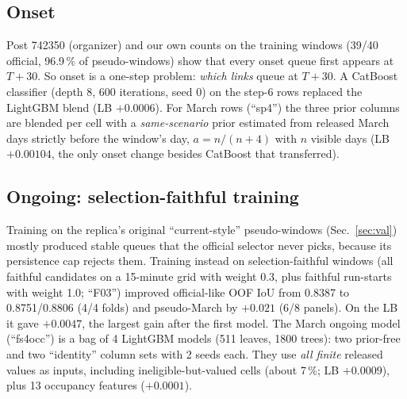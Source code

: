 \documentclass[conference,10pt]{IEEEtran}
\begin{document}
\subsection{Onset}
Post 742350 (organizer) and our own counts on the training windows (39/40 official, 96.9\,\% of pseudo-windows) show that every
onset queue first appears at $T{+}30$. So onset is a one-step problem: \emph{which links} queue at $T{+}30$. A CatBoost classifier
(depth 8, 600 iterations, seed 0) on the step-6 rows replaced the LightGBM blend (LB $+0.0006$). For March rows (``sp4'') the three
prior columns are blended per cell with a \emph{same-scenario} prior estimated from released March days strictly before the window's
day, $a=n/(n+4)$ with $n$ visible days (LB $+0.00104$, the only onset change besides CatBoost that transferred).

\subsection{Ongoing: selection-faithful training}
Training on the replica's original ``current-style'' pseudo-windows (Sec.~\ref{sec:val}) mostly produced stable queues that the official
selector never picks, because its persistence cap rejects them. Training instead on selection-faithful windows (all faithful candidates
on a 15-minute grid with weight 0.3, plus faithful run-starts with weight 1.0; ``F03'') improved official-like OOF IoU from 0.8387 to
0.8751/0.8806 (4/4 folds) and pseudo-March by $+0.021$ (6/8 panels). On the LB it gave $+0.0047$, the largest gain after the first model.
The March ongoing model (``fs4occ'') is a bag of 4 LightGBM models (511 leaves, 1800 trees): two prior-free and two
``identity'' column sets with 2 seeds each. They use \emph{all finite} released values as inputs, including ineligible-but-valued
cells (about 7\,\%; LB $+0.0009$), plus 13 occupancy features ($+0.0001$).
\end{document}
